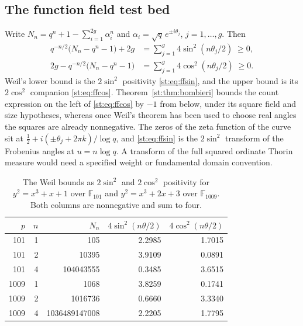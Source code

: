 \subsection{The function field test bed}
Write $N_n=q^n+1-\sum_{i=1}^{2g}\alpha_i^n$ and $\alpha_i=\sqrt q\,e^{\pm i\theta_j}$, $j=1,\dots,g$. Then
\begin{align}
q^{-n/2}\big(N_n-q^n-1\big)+2g&=\sum_{j=1}^g 4\sin^2(n\theta_j/2)\;\ge 0, \label{st:eq:ffsin}\\
2g-q^{-n/2}\big(N_n-q^n-1\big)&=\sum_{j=1}^g 4\cos^2(n\theta_j/2)\;\ge 0. \label{st:eq:ffcos}
\end{align}
Weil's lower bound is the $2\sin^2$ positivity \eqref{st:eq:ffsin}, and the upper bound is its $2\cos^2$ companion \eqref{st:eq:ffcos}. Theorem~\ref{st:thm:bombieri} bounds the count expression on the left of \eqref{st:eq:ffcos} by $-1$ from below, under its square field and size hypotheses, whereas once Weil's theorem has been used to choose real angles the squares are already nonnegative. The zeros of the zeta function of the curve sit at $\tfrac12+i(\pm\theta_j+2\pi k)/\log q$, and \eqref{st:eq:ffsin} is the $2\sin^2$ transform of the Frobenius angles at $u=n\log q$. A transform of the full squared ordinate Thorin measure would need a specified weight or fundamental domain convention.
\begin{table}[h]\centering\small
\begin{tabular}{rrrrr}
\toprule
$p$ & $n$ & $N_n$ & $4\sin^2(n\theta/2)$ & $4\cos^2(n\theta/2)$\\
\midrule
101 & 1 & 105 & 2.2985 & 1.7015\\
101 & 2 & 10395 & 3.9109 & 0.0891\\
101 & 4 & 104043555 & 0.3485 & 3.6515\\
1009 & 1 & 1068 & 3.8259 & 0.1741\\
1009 & 2 & 1016736 & 0.6660 & 3.3340\\
1009 & 4 & 1036489147008 & 2.2205 & 1.7795\\
\bottomrule
\end{tabular}
\caption{The Weil bounds as $2\sin^2$ and $2\cos^2$ positivity for $y^2=x^3+x+1$ over $\mathbb F_{101}$ and $y^2=x^3+2x+3$ over $\mathbb F_{1009}$. Both columns are nonnegative and sum to four.}\label{st:tab:curves}
\end{table}

